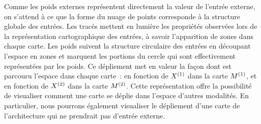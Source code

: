 \documentclass[../main]{subfiles}
\begin{document}
Comme les poids externes représentent directement la valeur de l'entrée externe, on s'attend à ce que la forme du nuage de points corresponde à la structure globale des entrées.
Les tracés mettent en lumière les propriétés observées lors de la représentation cartographique des entrées, à savoir l'apparition de zones dans chaque carte. 
Les poids suivent la structure circulaire des entrées en découpant l'espace en zones et marquent les portions du cercle qui sont effectivement représentées par les poids.
Ce dépliement met en valeur la façon dont est parcouru l'espace dans chaque carte~: en fonction de $X^{({1})}$ dans la carte $M^{({1})}$, et en fonction de $X^{({2})}$ dans la carte $M^{({2})}$.
Cette représentation offre la possibilité de visualiser comment une carte se déplie dans l'espace d'autres modalités.
En particulier, nous pourrons également visualiser le dépliement d'une carte de l'architecture qui ne prendrait pas d'entrée externe.
\end{document}
